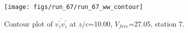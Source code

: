 \begin{figure}[H]
\centering
\texttt{[image: figs/run\_67/run\_67\_ww\_contour]}
\caption{Contour plot of $\overline{v_{z}^{\prime} v_{z}^{\prime}}$ at $z/c$=10.00, $V_{free}$=27.05, station 7.}
\label{fig:run_67_ww_contour}
\end{figure}



